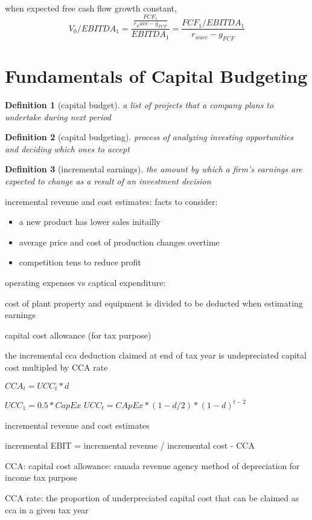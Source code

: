 \documentclass[10pt]{article}
\theoremstyle{break}
\newtheorem{defn}{Definition}[subsection]
\begin{document}
when expected free cash flow growth constant, 
$$V_0/EBITDA_1=\frac{\frac{FCF_1}{r_wacc-g_{FCF}}}{EBITDA_1}=\frac{FCF_1/EBITDA_1}{r_{wacc}-g_{FCF}}$$

\section{Fundamentals of Capital Budgeting}
\begin{defn}[capital budget]
    a list of projects that a company plans to undertake during next period
\end{defn}

\begin{defn}[capital budgeting]
    process of analyzing investing opportunities and deciding which ones to accept
\end{defn}

\begin{defn}[incremental earnings]
    the amount by which a firm's earnings are expected to change as a result of an investment decision
\end{defn}

incremental revenue and cost estimates: facts to consider:
\begin{itemize}
    \item a new product has lower sales initailly 
    \item average price and cost of production changes overtime 
    \item competition tens to reduce profit
\end{itemize}

operating expenses vs captical expenditure:

cost of plant property and equipment is divided to be deducted when estimating earnings

capital cost allowance (for tax purpose)

the incremental cca deduction claimed at end of tax year is undepreciated capital cost multipled by CCA rate

$CCA_t = UCC_t*d$

$UCC_1 = 0.5* CapEx$
$UCC_t = CApEx * (1-d/2)*(1-d)^{t-2}$

incremental revenue and cost estimates 

incremental EBIT = incremental revenue / incremental cost - CCA

CCA: capital cost allowance: canada revenue agency method of depreciation for income tax purpose 

CCA rate: the proportion of underpreciated capital cost that can be claimed as cca in a given tax year
\end{document}
